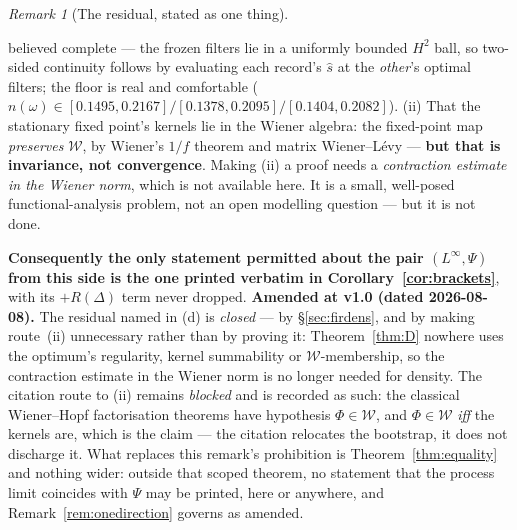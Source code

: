 \documentclass[11pt]{article}
\theoremstyle{definition}
\theoremstyle{remark}
\newtheorem{remark}{Remark}
\begin{document}
\begin{remark}[The residual, stated as one thing]
\begin{enumerate}
believed complete --- the frozen filters lie in a uniformly bounded $H^2$
ball, so two-sided continuity follows by evaluating each record's $\hat s$ at
the \emph{other}'s optimal filters; the floor is real and comfortable
($n(\omega)\in[0.1495,0.2167]/[0.1378,0.2095]/[0.1404,0.2082]$). (ii) That the
stationary fixed point's kernels lie in the Wiener algebra: the fixed-point map
\emph{preserves} $\mathcal W$, by Wiener's $1/f$ theorem and matrix
Wiener--L\'evy --- \textbf{but that is invariance, not convergence}. Making
(ii) a proof needs a \emph{contraction estimate in the Wiener norm}, which is
not available here. It is a small, well-posed functional-analysis problem, not
an open modelling question --- but it is not done.
\end{enumerate}
\textbf{Consequently the only statement permitted about the pair
$(L^\infty,\Psi)$ from this side is the one printed verbatim in
Corollary~\ref{cor:brackets}}, with its $+R(\Delta)$ term never dropped.
\textbf{Amended at v1.0 (dated 2026-08-08).} The residual named in (d) is
\emph{closed} --- by \S\ref{sec:firdens}, and by making route~(ii)
unnecessary rather than by proving it: Theorem~\ref{thm:D} nowhere uses the
optimum's regularity, kernel summability or $\mathcal W$-membership, so the
contraction estimate in the Wiener norm is no longer needed for density. The
citation route to (ii) remains \emph{blocked} and is recorded as such: the
classical Wiener--Hopf factorisation theorems have hypothesis $\Phi\in\mathcal
W$, and $\Phi\in\mathcal W$ \emph{iff} the kernels are, which is the claim ---
the citation relocates the bootstrap, it does not discharge it. What replaces
this remark's prohibition is Theorem~\ref{thm:equality} and nothing wider:
outside that scoped theorem, no statement that the process limit coincides
with $\Psi$ may be printed, here or anywhere, and
Remark~\ref{rem:onedirection} governs as amended.
\end{remark}
\end{document}
